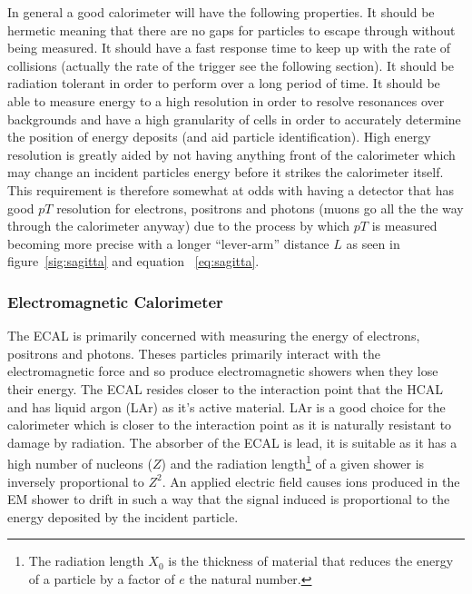 In general a good calorimeter will have the following properties. It should be
hermetic meaning that there are no gaps for particles to escape through without
being measured. It should have a fast response time to keep up with the rate of
collisions (actually the rate of the trigger see the following section). It
should be radiation tolerant in order to perform over a long period of time. It
should be able to measure energy to a high resolution in order to resolve
resonances over backgrounds and have a high granularity of cells in order to
accurately determine the position of energy deposits (and aid particle
identification). High energy resolution is greatly aided by not having anything
front of the calorimeter which may change an incident particles energy before it
strikes the calorimeter itself. This requirement is therefore somewhat at odds
with having a detector that has good $pT$ resolution for electrons, positrons
and photons (muons go all the the way through the calorimeter anyway) due to the
process by which $pT$ is measured becoming more precise with a longer
``lever-arm'' distance $L$ as seen in figure~\ref{sig:sagitta} and equation ~\ref{eq:sagitta}.

\subsubsection{Electromagnetic Calorimeter}
The ECAL is primarily concerned with measuring the energy of electrons,
positrons and photons. Theses particles primarily interact with the
electromagnetic force and so produce electromagnetic showers when they lose
their energy. The ECAL resides closer to the interaction point that the HCAL and
has liquid argon (LAr) as it's active material. LAr is a good choice for the
calorimeter which is closer to the interaction point as it is naturally
resistant to damage by radiation. The absorber of the ECAL is lead, it is
suitable as it has a high number of nucleons ($Z$) and the radiation
length\footnote{The radiation length $X_{0}$ is the thickness of material that
  reduces the energy of a particle by a factor of $e$ the natural number.} of a
given shower is inversely proportional to $Z^2$. An applied electric field
causes ions produced in the EM shower to drift in such a way that the signal
induced is proportional to the energy deposited by the incident particle.

